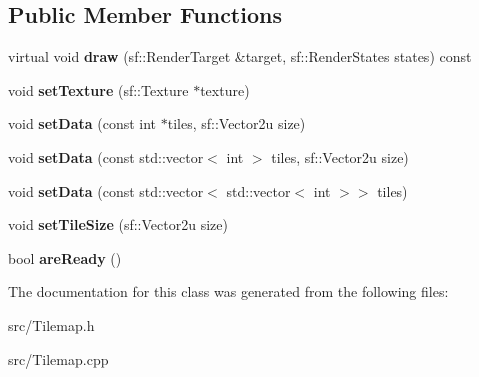 \subsection*{Public Member Functions}
\begin{DoxyCompactItemize}
\item 
\mbox{\label{class_tilemap_afa127579da6508416a46a342e612159e}} 
virtual void {\bfseries draw} (sf\+::\+Render\+Target \&target, sf\+::\+Render\+States states) const
\item 
\mbox{\label{class_tilemap_a0b9d07eabd3af784469d3b041670332a}} 
void {\bfseries set\+Texture} (sf\+::\+Texture $\ast$texture)
\item 
\mbox{\label{class_tilemap_af4f3d47c6306b282e69a1bf0ab96c300}} 
void {\bfseries set\+Data} (const int $\ast$tiles, sf\+::\+Vector2u size)
\item 
\mbox{\label{class_tilemap_aa343c0da89a3d639a56524fa5acbc60b}} 
void {\bfseries set\+Data} (const std\+::vector$<$ int $>$ tiles, sf\+::\+Vector2u size)
\item 
\mbox{\label{class_tilemap_a656b70f63c1ec3b19176fa3a697145cc}} 
void {\bfseries set\+Data} (const std\+::vector$<$ std\+::vector$<$ int $>$$>$ tiles)
\item 
\mbox{\label{class_tilemap_aaf28e7284fde64db7cd2af79ef4f0ed8}} 
void {\bfseries set\+Tile\+Size} (sf\+::\+Vector2u size)
\item 
\mbox{\label{class_tilemap_ad2f10226e5601f04c0d896680bbdb4cb}} 
bool {\bfseries are\+Ready} ()
\end{DoxyCompactItemize}


The documentation for this class was generated from the following files\+:\begin{DoxyCompactItemize}
\item 
src/Tilemap.\+h\item 
src/Tilemap.\+cpp\end{DoxyCompactItemize}

